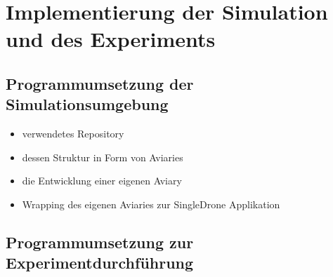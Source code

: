\section{Implementierung der Simulation und des Experiments}
\subsection{Programmumsetzung der Simulationsumgebung}
\begin{itemize}
    \item verwendetes Repository
    \item dessen Struktur in Form von Aviaries
    \item die Entwicklung einer eigenen Aviary 
    \item Wrapping des eigenen Aviaries zur SingleDrone Applikation
\end{itemize}
\subsection{Programmumsetzung zur Experimentdurchführung}